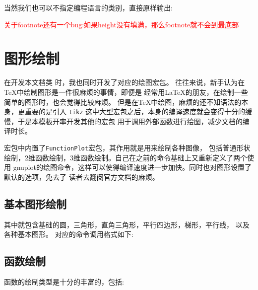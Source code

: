 \documentclass[lang=cn, math=mathptmx]{ZLaTeX}
\begin{document}
当然我们也可以不指定编程语言的类别，直接原样输出:
\begin{bytes}
\newenvironment{definition}[1][]{%
        \stepcounter{definition}%
        \begin{tcolorbox}[%
            enhanced,
            arc=3pt,
            frame hidden,
}{\end{tcolorbox}}
\end{bytes}


\vfill
\textcolor{red}{\kaishu 关于footnote还有一个bug:如果height没有填满，那么footnote就不会到最底部}

\section{图形绘制}
在开发本文档类 \zlatex{}时，我也同时开发了对应的绘图宏包。
往往来说，新手认为在\TeX{}中绘制图形是一件很麻烦的事情，即便是
经常用\LaTeX{}的朋友，在绘制一些简单的图形时，也会觉得比较麻烦。
但是在\TeX{}中绘图，麻烦的还不知语法的本身，更重要的是引入 \verb|tikz|
这中大型宏包之后，本身的编译速度就会变得十分的缓慢，于是本模板开率开发其他的宏包
用于调用外部函数进行绘图，减少文档的编译时长。

\zlatex{}宏包中内置了\texttt{FunctionPlot}宏包，其作用就是用来绘制各种图像，
包括普通形状绘制，2维函数绘制，3维函数绘制。自己在之前的命令基础上又重新定义了两个使用
gnuplot的绘图命令，这样可以使得编译速度进一步加快。同时也对图形设置了默认的选项，免去了
读者去翻阅官方文档的麻烦。

\subsection{基本图形绘制}
其中就包含基础的圆，三角形，直角三角形，平行四边形，梯形，平行线，
以及各种基本图形。
对应的命令调用格式如下:
\begin{bytes}
\end{bytes}


\subsection{函数绘制}
函数的绘制类型是十分的丰富的，包括:
\end{document}
